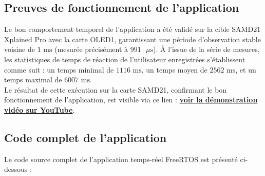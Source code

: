 \subsection{Preuves de fonctionnement de l'application}

Le bon comportement temporel de l'application a été validé sur la cible SAMD21 Xplained Pro avec la carte OLED1, garantissant une période d'observation stable voisine de $1\text{ ms}$ (mesurée précisément à $991\text{ }\mu\text{s}$). À l'issue de la série de mesures, les statistiques de temps de réaction de l'utilisateur enregistrées s'établissent comme suit : un temps minimal de $1116\text{ ms}$, un temps moyen de $2562\text{ ms}$, et un temps maximal de $6007\text{ ms}$. \\

Le résultat de cette exécution sur la carte SAMD21, confirmant le bon fonctionnement de l'application, est visible via ce lien : \href{https://youtube.com/shorts/WNDGfWiWxSI?feature=share}{\textbf{voir la démonstration vidéo sur YouTube}}. \\

\subsection{Code complet de l'application}

Le code source complet de l'application temps-réel FreeRTOS est présenté ci-dessous : \\

